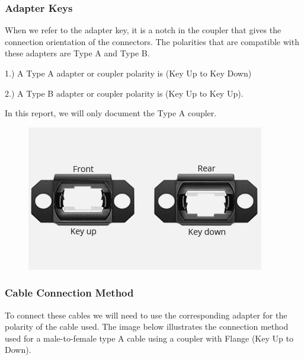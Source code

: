 \subsubsection{Adapter Keys}

When we refer to the adapter key, it is a notch in the coupler that gives the connection orientation of the connectors. The polarities that are compatible with these adapters are Type A and Type B.

1.) A Type A adapter or coupler polarity is (Key Up to Key Down)

2.) A Type B adapter or coupler polarity is  (Key Up to Key Up).


In this report, we will only document the Type A coupler.


\begin{figure}
  \includegraphics[width=\textwidth]{images/8.jpg}
  \label{fig:jlsimon}
\end{figure}

\subsubsection{Cable Connection Method}

To connect these cables we will need to use the corresponding adapter for the polarity of the cable used. The image below illustrates the connection method used for a male-to-female type A cable using a coupler with Flange (Key Up to Down).

